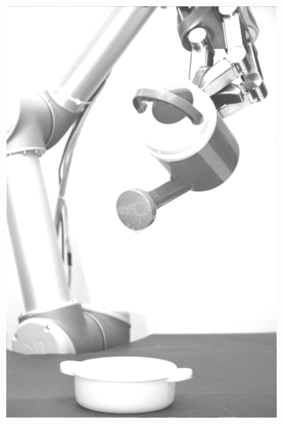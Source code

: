 \begin{figure}[H]
\begin{subfigure}[b]{0.1\textwidth}
        \includegraphics[width=\textwidth]{img3/test/contrast_5_1_3_final_img3.png}
    \end{subfigure}
        \begin{subfigure}[b]{0.1\textwidth}

\end{subfigure}
\end{figure}
